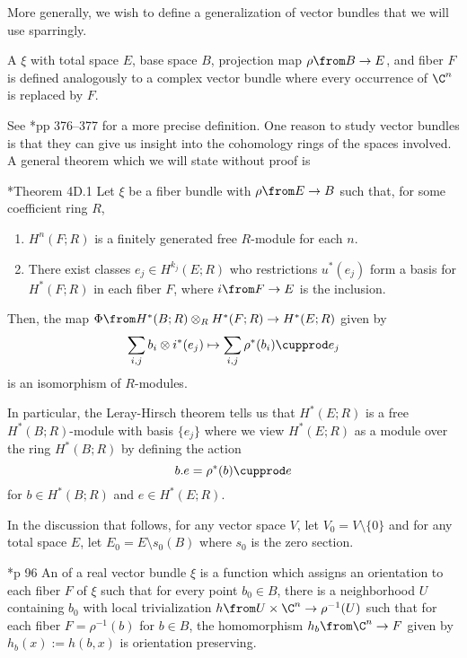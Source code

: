 \documentclass[11pt,leqno,oneside]{amsbook}
\numberwithin{thm}{section}
\begin{document}
More generally, we wish to define a generalization of vector bundles
that we will use sparringly.
\begin{defn}
   A  \(\xi\) with total space \(E\), base space
   \(B\), projection map \(\rho \from B \to E\), and fiber \(F\) is
   defined analogously to a complex vector bundle where every
   occurrence of \(\C^n\) is replaced by \(F\).
\end{defn}
See \cite{hatcher}*{pp 376--377} for a more precise definition. 
One reason to study vector bundles is that they can give us insight
into the cohomology rings of the spaces involved. A general theorem
which we will state without proof is
\begin{thm}
  \cite{hatcher}*{Theorem 4D.1} Let \(\xi\) be a fiber bundle with
  \(\rho \from E \to B\) such that, for some coefficient ring \(R\),
  \begin{enumerate}
  \item \(H^n(F;R)\) is a finitely generated free \(R\)-module for
    each \(n\).
  \item There exist classes \(e_j \in H^{k_j}(E;R)\) who restrictions
    \(u^*(e_j)\) form a basis for \(H^*(F;R)\) in each fiber \(F\),
    where \(i \from F \to E\) is the inclusion.
  \end{enumerate}
  Then, the map \(\Phi \from H^*(B;R) \otimes_R H^*(F;R) \to
  H^*(E;R)\) given by \[
    \sum_{i,j} b_i \otimes i^*(e_j) \mapsto \sum_{i,j} \rho^*(b_i)
    \cupprod e_j
  \]
  is an isomorphism of \(R\)-modules.
\end{thm}
In particular, the Leray-Hirsch theorem tells us that \(H^*(E;R)\) is
a free \(H^*(B;R)\)-module with basis \(\{e_j\}\) where we view
\(H^*(E;R)\) as a module over the ring \(H^*(B;R)\) by defining the
action \[
  b.e = \rho^*(b) \cupprod e
\]
for \(b \in H^*(B;R)\) and \(e \in H^*(E;R)\).
\begin{defn}
  In the discussion that follows, for any vector space \(V\), let
  \(V_0 = V \setminus \{0\}\) and for any total space \(E\), let \(E_0
  = E \setminus s_0(B)\) where \(s_0\) is the zero section.
\end{defn}
\begin{defn}
  \cite{milnor-stasheff}*{p 96} An  of a real vector
  bundle 
  \(\xi\) is a function which assigns an orientation to each fiber
  \(F\) of \(\xi\) such that for every point \(b_0 \in B\), there is a
  neighborhood \(U\) containing \(b_0\) with local
  trivialization \(h \from U \times \C^n \to \rho^{-1}(U)\) such that
  for each fiber \(F = \rho^{-1}(b)\) for \(b \in B\), the
  homomorphism \(h_b \from \C^n \to F\) given by \(h_b(x) := h(b,x)\)
  is orientation preserving. 
\end{defn}
\end{document}
